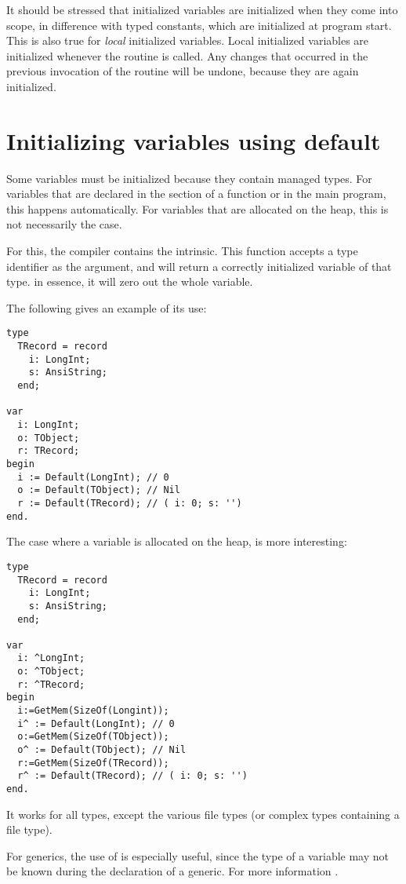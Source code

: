 \begin{remark}
It should be stressed that initialized variables are initialized when they
come into scope, in difference with typed constants, which are initialized 
at program start.
This is also true for {\em local} initialized variables. Local initialized
variables are initialized whenever the routine is called. Any changes that
occurred in the previous invocation of the routine will be undone, because
they are again initialized.
\end{remark}

\section{Initializing variables using default}
\label{se:initusingdefault}
Some variables must be initialized because they contain managed types. 
For variables that are declared in the   section of a function or in the main program, this happens automatically.
For variables that are allocated on the heap, this is not necessarily the case.

For this, the compiler contains the  intrinsic. This function accepts a type identifier as the argument, 
and will return a correctly initialized variable of that type. in essence, it will zero out the whole variable.

The following gives an example of its use:
\begin{verbatim}
type
  TRecord = record
    i: LongInt;
    s: AnsiString;
  end;
 
var
  i: LongInt;
  o: TObject;
  r: TRecord;
begin
  i := Default(LongInt); // 0
  o := Default(TObject); // Nil
  r := Default(TRecord); // ( i: 0; s: '')
end.
\end{verbatim}
The case where a variable is allocated on the heap, is more interesting:
\begin{verbatim}
type
  TRecord = record
    i: LongInt;
    s: AnsiString;
  end;
 
var
  i: ^LongInt;
  o: ^TObject;
  r: ^TRecord;
begin
  i:=GetMem(SizeOf(Longint));
  i^ := Default(LongInt); // 0
  o:=GetMem(SizeOf(TObject));
  o^ := Default(TObject); // Nil
  r:=GetMem(SizeOf(TRecord));
  r^ := Default(TRecord); // ( i: 0; s: '')
end.
\end{verbatim}
It works for all types, except the various file types (or complex types containing a file type).

\begin{remark}
For generics, the use of  is especially useful, since the type of a variable may not 
be known during the declaration of a generic. For more information .
\end{remark}

